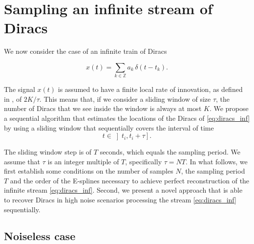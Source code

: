\documentclass{article}
\providecommand{\red}[1]{\textcolor{red}{#1}}
\begin{document}
\section{Sampling an infinite stream of Diracs}
\label{sec:inf_stream}

We now consider the case of an infinite train of Diracs 

\begin{equation}
x(t) = \sum_{k \in \mathbb{Z}} a_k \, \delta \left( t - t_k \right).
\label{eq:diracs_inf}
\end{equation}

\noindent
The signal $x(t)$ is assumed to have a finite local rate of innovation, 
as defined in \cite{vetterli2002}, of $2K/\tau$. This means that, 
if we consider a sliding window of size $\tau$, the number of Diracs 
that we see inside the window is always  at most $K$.
We propose a sequential algorithm that estimates the locations of the 
Diracs of \eqref{eq:diracs_inf} by using a sliding
window that sequentially covers the interval of time
\begin{equation} 
t \in \left] t_i, t_i + \tau \right].
\label{eq:tempInt}
\end{equation}

\noindent
The sliding window step is of $T$ seconds, which equals the sampling period.
We assume that $\tau$ is an integer multiple of $T$, specifically $\tau = NT$.
In what follows, we first establish some conditions on the number of samples $N$, the sampling period $T$ and
the order of the E-splines necessary to achieve perfect reconstruction of the infinite stream \eqref{eq:diracs_inf}. 
Second, we present a novel approach that is able to recover Diracs in high noise scenarios
processing the stream \eqref{eq:diracs_inf} sequentially.


\subsection{Noiseless case}
\end{document}
